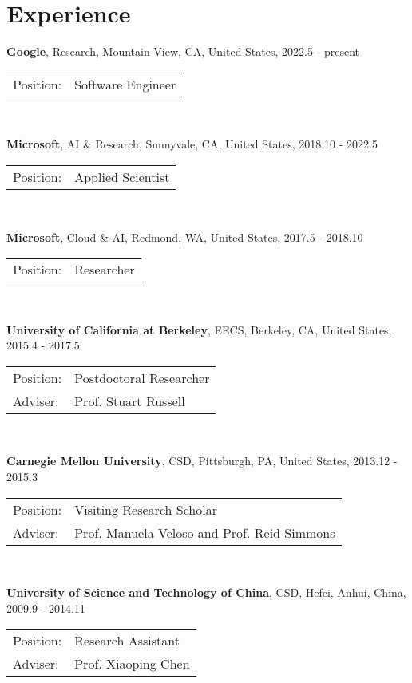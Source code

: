 \documentclass[letterpaper,10pt]{article}
\renewenvironment{itemize}{
  \begin{list}{}{
    \setlength{\leftmargin}{1.5em}
  }
}{
  \end{list}
}
\begin{document}
\section*{Experience}
\begin{itemize}
  \item \textbf{Google}, Research, Mountain View, CA, United States, 2022.5 - present \\
	      \begin{tabular}{ll}
		      Position: & Software Engineer   \\
	      \end{tabular} \\
	\item \textbf{Microsoft}, AI \& Research, Sunnyvale, CA, United States, 2018.10 - 2022.5 \\
	      \begin{tabular}{ll}
		      Position: & Applied Scientist   \\
	      \end{tabular} \\
	\item \textbf{Microsoft}, Cloud \& AI, Redmond, WA, United States, 2017.5 - 2018.10 \\
	      \begin{tabular}{ll}
		      Position: & Researcher             \\
	      \end{tabular} \\
	\item \textbf{University of California at Berkeley}, EECS, Berkeley, CA, United States, 2015.4 - 2017.5 \\
	      \begin{tabular}{ll}
		      Position: & Postdoctoral Researcher                                 \\
		      Adviser:  & Prof. Stuart Russell                                    \\
	      \end{tabular} \\
	\item \textbf{Carnegie Mellon University}, CSD, Pittsburgh, PA, United States, 2013.12 - 2015.3 \\
	      \begin{tabular}{ll}
		      Position: & Visiting Research Scholar                         \\
		      Adviser:  & Prof. Manuela Veloso and Prof. Reid Simmons       \\
	      \end{tabular} \\
	\item \textbf{University of Science and Technology of China}, CSD, Hefei, Anhui, China, 2009.9 - 2014.11 \\
	      \begin{tabular}{ll}
		      Position: & Research Assistant                              \\
		      Adviser:  & Prof. Xiaoping Chen                             \\
	      \end{tabular} \\
\end{itemize}
\end{document}
